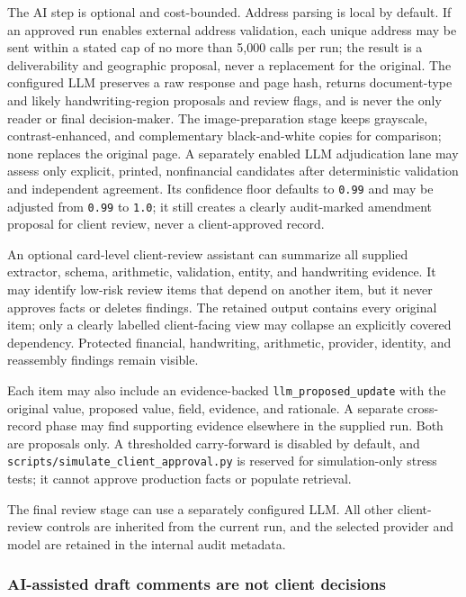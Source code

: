 \documentclass[
]{article}
\begin{document}
The AI step is optional and cost-bounded. Address parsing is local by
default. If an approved run enables external address validation, each
unique address may be sent within a stated cap of no more than 5,000
calls per run; the result is a deliverability and geographic proposal,
never a replacement for the original. The configured LLM preserves a raw
response and page hash, returns document-type and likely
handwriting-region proposals and review flags, and is never the only
reader or final decision-maker. The image-preparation stage keeps
grayscale, contrast-enhanced, and complementary black-and-white copies
for comparison; none replaces the original page. A separately enabled
LLM adjudication lane may assess only explicit, printed, nonfinancial
candidates after deterministic validation and independent agreement. Its
confidence floor defaults to \texttt{0.99} and may be adjusted from
\texttt{0.99} to \texttt{1.0}; it still creates a clearly audit-marked
amendment proposal for client review, never a client-approved record.

An optional card-level client-review assistant can summarize all
supplied extractor, schema, arithmetic, validation, entity, and
handwriting evidence. It may identify low-risk review items that depend
on another item, but it never approves facts or deletes findings. The
retained output contains every original item; only a clearly labelled
client-facing view may collapse an explicitly covered dependency.
Protected financial, handwriting, arithmetic, provider, identity, and
reassembly findings remain visible.

Each item may also include an evidence-backed
\texttt{llm\_\allowbreak{}proposed\_\allowbreak{}update} with the
original value, proposed value, field, evidence, and rationale. A
separate cross-record phase may find supporting evidence elsewhere in
the supplied run. Both are proposals only. A thresholded carry-forward
is disabled by default, and
\texttt{scripts/\allowbreak{}simulate\_\allowbreak{}client\_\allowbreak{}approval.py}
is reserved for simulation-only stress tests; it cannot approve
production facts or populate retrieval.

The final review stage can use a separately configured LLM. All other
client-review controls are inherited from the current run, and the
selected provider and model are retained in the internal audit metadata.

\subsubsection{AI-assisted draft comments are not client
decisions}\label{ai-assisted-draft-comments-are-not-client-decisions}
\end{document}
